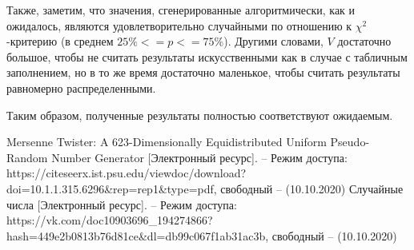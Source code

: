 \documentclass[a4paper,12pt]{article}
\begin{document}
	Также, заметим, что значения, сгенерированные алгоритмически, как и ожидалось, являются удовлетворительно случайными по отношению к $\chi^2$-критерию (в среднем $25\%<=p<=75\%$). Другими словами, $V$ достаточно большое, чтобы не считать результаты искусственными как в случае с табличным заполнением, но в то же время достаточно маленькое, чтобы считать результаты равномерно распределенными.
	
	Таким образом, полученные результаты полностью соответствуют ожидаемым.
	
	\newpage
	
	\begin{thebibliography}{2}
		Mersenne Twister: A 623-Dimensionally
		Equidistributed Uniform Pseudo-Random
		Number Generator [Электронный ресурс]. – Режим доступа: 
		https://citeseerx.ist.psu.edu/viewdoc/download?doi=10.1.1.315.6296\&rep=rep1\&type=pdf, 
		свободный – (10.10.2020)
		Случайные числа [Электронный ресурс]. – Режим доступа: 
		https://vk.com/doc10903696\_194274866?hash=449e2b0813b76d81ce\&dl=db99c067f1ab31ac3b, 
		свободный – (10.10.2020)
	\end{thebibliography}
	
	
	
\end{document}
